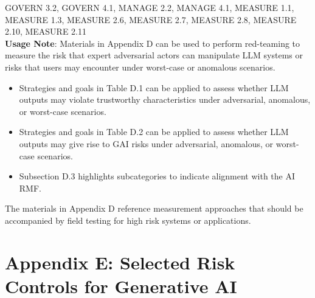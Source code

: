 \documentclass[fleqn]{article}
\begin{document}
GOVERN 3.2, GOVERN 4.1, MANAGE 2.2, MANAGE 4.1, MEASURE 1.1, MEASURE 1.3, MEASURE 2.6, MEASURE 2.7, MEASURE 2.8, MEASURE 2.10, MEASURE 2.11 \\

\noindent\textbf{Usage Note}: Materials in Appendix D can be used to perform red-teaming to measure the risk that expert adversarial actors can manipulate LLM systems or risks that users may encounter under worst-case or anomalous scenarios. 

\begin{itemize}
	\item Strategies and goals in Table D.1 can be applied to assess whether LLM outputs may violate trustworthy characteristics under adversarial, anomalous, or worst-case scenarios.   
	\item Strategies and goals in Table D.2 can be applied to assess whether LLM outputs may give rise to GAI risks under adversarial, anomalous, or worst-case scenarios.
	\item Subsection D.3 highlights subcategories to indicate alignment with the AI RMF.   
\end{itemize}

\noindent The materials in Appendix D reference measurement approaches that should be accompanied by field testing for high risk systems or applications.  

\pagebreak

\section*{Appendix E: Selected Risk Controls for Generative AI}\label{sec:appndxe}
\end{document}
